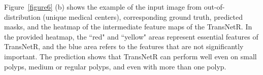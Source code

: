 \documentclass{midl} \usepackage{mwe}
\begin{document}
 Figure~\ref{figure6} (b) shows the example of the input image from out-of-distribution (unique medical centers), corresponding ground truth, predicted masks, and the heatmap of the intermediate feature maps of the TransNetR. In the provided heatmap, the ``red" and ``yellow" areas represent essential features of TransNetR, and the blue area refers to the features that are not significantly important. The prediction shows that TransNetR can perform well even on small polyps, medium or regular polyps, and even with more than one polyp.
\end{document}
